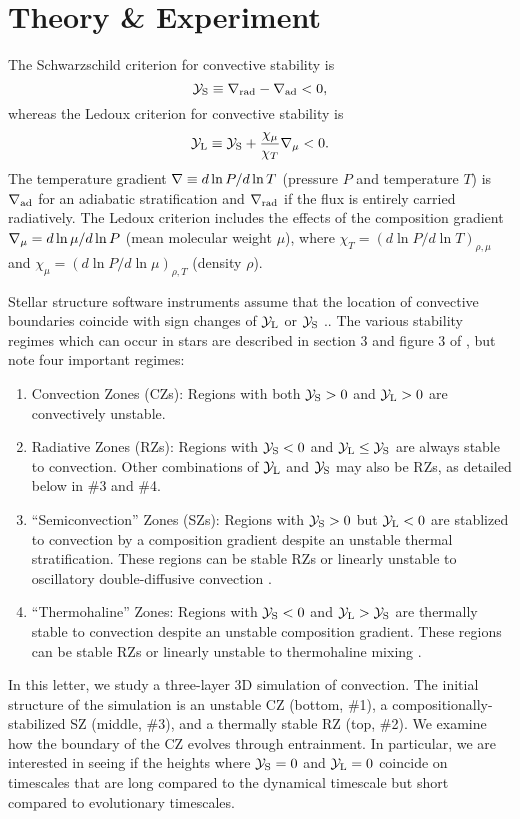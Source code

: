 \section{Theory \& Experiment}
\label{sec:theory}
The Schwarzschild criterion for convective stability is
\begin{equation}
    \yS \equiv \gradrad - \gradad < 0,
    \label{eqn:yS}
\end{equation}
whereas the Ledoux criterion for convective stability is
\begin{equation}
    \yL \equiv \yS +  \frac{\chi_\mu}{\chi_T}\gradmu < 0.
    \label{eqn:yL}
\end{equation}
The temperature gradient $\nabla \equiv d \ln P / d \ln T$ (pressure $P$ and temperature $T$) is $\nabla_{\rm{ad}}$ for an adiabatic stratification and $\nabla_{\rm{rad}}$ if the flux is entirely carried radiatively.
The Ledoux criterion includes the effects of the composition gradient $\nabla_{\mu} = d\ln\mu/d\ln P$ (mean molecular weight $\mu$), where $\chi_T = (d\ln P / d\ln T)_{\rho,\mu}$ and $\chi_\mu = (d\ln P / d\ln\mu)_{\rho,T}$ (density $\rho$).

Stellar structure software instruments assume that the location of convective boundaries coincide with sign changes of $\mathcal{Y}_{\rm{L}}$ or $\mathcal{Y}_{\rm{S}}$ \citep[][sec.~2]{mesa4}..
The various stability regimes which can occur in stars are described in section 3 and figure 3 of \citet{salaris_cassisi_2017}, but note four important regimes:
\begin{enumerate}
    \item Convection Zones (CZs): Regions with both $\mathcal{Y}_{\rm{S}} > 0$ and $\mathcal{Y}_{\rm{L}} > 0$ are convectively unstable.
    \item Radiative Zones (RZs): Regions with $\mathcal{Y}_{\rm{S}} < 0$ and $\mathcal{Y}_{\rm{L}} \leq \mathcal{Y}_{\rm{S}}$ are always stable to convection.
        Other combinations of $\mathcal{Y}_{\rm{L}}$ and $\mathcal{Y}_{\rm{S}}$ may also be RZs, as detailed below in \#3 and \#4.
    \item ``Semiconvection'' Zones (SZs): Regions with $\mathcal{Y}_{\rm{S}} > 0$ but $\mathcal{Y}_{\rm{L}} < 0$ are stablized to convection by a composition gradient despite an unstable thermal stratification.
        These regions can be stable RZs or linearly unstable to oscillatory double-diffusive convection \citep[ODDC, see][chapters 2 and 4]{garaud_2018}.
    \item ``Thermohaline'' Zones: Regions with $\mathcal{Y}_{\rm{S}} < 0$ and $\mathcal{Y}_{\rm{L}} > \mathcal{Y}_{\rm{S}}$ are thermally stable to convection despite an unstable composition gradient.
        These regions can be stable RZs or linearly unstable to thermohaline mixing \citep[see][chapters 2 and 3]{garaud_2018}.
\end{enumerate}
In this letter, we study a three-layer 3D simulation of convection.
The initial structure of the simulation is an unstable CZ (bottom, \#1), a compositionally-stabilized SZ (middle, \#3), and a thermally stable RZ (top, \#2).
We examine how the boundary of the CZ evolves through entrainment.
In particular, we are interested in seeing if the heights where $\mathcal{Y}_{\rm{S}} = 0$ and $\mathcal{Y}_{\rm{L}} = 0$ coincide on timescales that are long compared to the dynamical timescale but short compared to evolutionary timescales.


